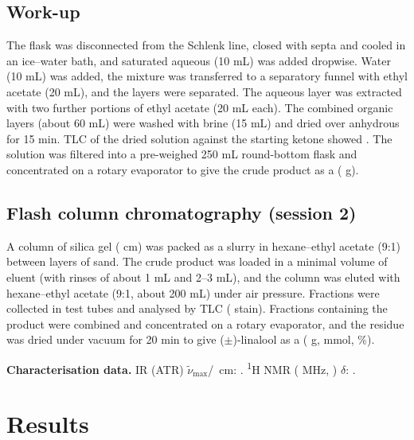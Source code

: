 \documentclass[11pt,a4paper]{article}
\begin{document}
\subsection{Work-up}
The flask was disconnected from the Schlenk line, closed with septa and cooled in an ice--water bath, and saturated aqueous  (10 mL) was added dropwise.  Water (10 mL) was added, the mixture was transferred to a separatory funnel with ethyl acetate (20 mL), and the layers were separated. The aqueous layer was extracted with two further portions of ethyl acetate (20 mL each). The combined organic layers (about 60 mL) were washed with brine (15 mL) and dried over anhydrous  for 15 min. TLC of the dried solution against the starting ketone showed . The solution was filtered into a pre-weighed 250 mL round-bottom flask and concentrated on a rotary evaporator to give the crude product as a  ( g).

\subsection{Flash column chromatography (session 2)}
A column of silica gel ( cm) was packed as a slurry in hexane--ethyl acetate (9:1) between layers of sand. The crude product was loaded in a minimal volume of eluent (with rinses of about 1 mL and 2--3 mL), and the column was eluted with hexane--ethyl acetate (9:1, about 200 mL) under air pressure. Fractions were collected in test tubes and analysed by TLC ( stain). Fractions  containing the product were combined and concentrated on a rotary evaporator, and the residue was dried under vacuum for 20 min to give ($\pm$)-linalool as a  ( g,  mmol, \%).

\noindent\textbf{Characterisation data.} IR (ATR) $\tilde{\nu}_\text{max}$/\si{\per\centi\metre}: . \textsuperscript{1}H NMR ( MHz, ) $\delta$: .

\section{Results}
\end{document}
